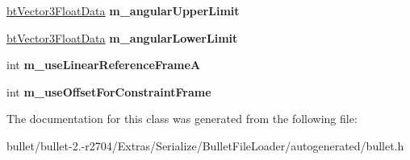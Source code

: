 \begin{DoxyCompactItemize}
\item 
\hypertarget{class_bullet_1_1bt_generic6_dof_constraint_data_af264cba825d8e1b886df1ae4d062f251}{\hyperlink{class_bullet_1_1bt_vector3_float_data}{bt\+Vector3\+Float\+Data} {\bfseries m\+\_\+angular\+Upper\+Limit}}\label{class_bullet_1_1bt_generic6_dof_constraint_data_af264cba825d8e1b886df1ae4d062f251}

\item 
\hypertarget{class_bullet_1_1bt_generic6_dof_constraint_data_a7bc300c0fb4e5899b8c98c3ae8f3fb74}{\hyperlink{class_bullet_1_1bt_vector3_float_data}{bt\+Vector3\+Float\+Data} {\bfseries m\+\_\+angular\+Lower\+Limit}}\label{class_bullet_1_1bt_generic6_dof_constraint_data_a7bc300c0fb4e5899b8c98c3ae8f3fb74}

\item 
\hypertarget{class_bullet_1_1bt_generic6_dof_constraint_data_a59bc3bc6052cd24febaae3b8e2721f3a}{int {\bfseries m\+\_\+use\+Linear\+Reference\+Frame\+A}}\label{class_bullet_1_1bt_generic6_dof_constraint_data_a59bc3bc6052cd24febaae3b8e2721f3a}

\item 
\hypertarget{class_bullet_1_1bt_generic6_dof_constraint_data_a2bc95b35d4c580cdfe1969ddc3151636}{int {\bfseries m\+\_\+use\+Offset\+For\+Constraint\+Frame}}\label{class_bullet_1_1bt_generic6_dof_constraint_data_a2bc95b35d4c580cdfe1969ddc3151636}

\end{DoxyCompactItemize}


The documentation for this class was generated from the following file\+:\begin{DoxyCompactItemize}
\item 
bullet/bullet-\/2.-\/r2704/\+Extras/\+Serialize/\+Bullet\+File\+Loader/autogenerated/bullet.\+h\end{DoxyCompactItemize}

